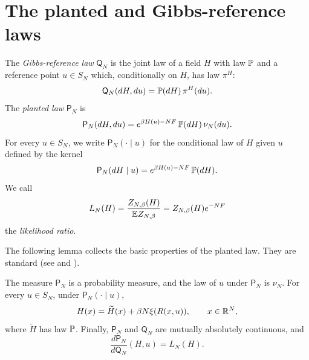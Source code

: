 \section{The planted and Gibbs-reference laws}\label{sec:pr-planted}

\begin{definition}\label{def:pr-planted}
The \emph{Gibbs-reference law} $\mathsf Q_N$ is the joint law of a field $H$ with law $\mathbb P$ and a reference point $u\in S_N$ which, conditionally on $H$, has law $\pi^H$:
\[
\mathsf Q_N(dH,du)=\mathbb P(dH)\,\pi^H(du).
\]
The \emph{planted law} $\mathsf P_N$ is
\[
\mathsf P_N(dH,du)=e^{\beta H(u)-NF}\,\mathbb P(dH)\,\nu_N(du).
\]
For every $u\in S_N$, we write $\mathsf P_N(\cdot\mid u)$ for the conditional law of $H$ given $u$ defined by the kernel
\[
\mathsf P_N(dH\mid u)=e^{\beta H(u)-NF}\,\mathbb P(dH).
\]
We call
\[
L_N(H)=\frac{Z_{N,\beta}(H)}{\mathbb E Z_{N,\beta}}=Z_{N,\beta}(H)e^{-NF}
\]
the \emph{likelihood ratio}.
\end{definition}

The following lemma collects the basic properties of the planted law. They are standard (see \cite[Eq.~(2.4)]{AuffingerElAlaouiSellke2025} and \cite[Proposition~3.7]{ElAlaouiMontanariSellke2025}).

\begin{lemma}\label{lem:pr-planted}
The measure $\mathsf P_N$ is a probability measure, and the law of $u$ under $\mathsf P_N$ is $\nu_N$. For every $u\in S_N$, under $\mathsf P_N(\cdot\mid u)$,
\begin{equation}\label{eq:pr-tilt}
H(x)=\widetilde H(x)+\beta N\xi(R(x,u)),\qquad x\in\mathbb R^N,
\end{equation}
where $\widetilde H$ has law $\mathbb P$. Finally, $\mathsf P_N$ and $\mathsf Q_N$ are mutually absolutely continuous, and
\begin{equation}\label{eq:pr-likelihood}
\frac{d\mathsf P_N}{d\mathsf Q_N}(H,u)=L_N(H).
\end{equation}
\end{lemma}

